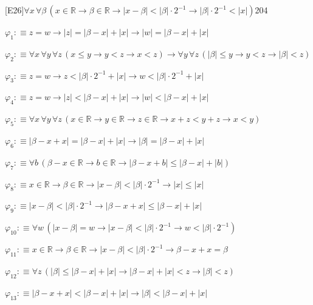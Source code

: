 \begin{fullproof}{[E26]}{$\forall x\,\forall \beta\,(x \in \mathbb{R} \to \beta \in \mathbb{R} \to \lvert x - \beta \rvert < \lvert \beta \rvert \cdot 2^{-1} \to \lvert \beta \rvert \cdot 2^{-1} < \lvert x \rvert)$}{204}
\begin{abbrevlist}
\item $\varphi_{1} :\equiv z = w \to \lvert z \rvert = \lvert \beta - x \rvert + \lvert x \rvert \to \lvert w \rvert = \lvert \beta - x \rvert + \lvert x \rvert$
\item $\varphi_{2} :\equiv \forall x\,\forall y\,\forall z\,(x \leq y \to y < z \to x < z) \to \forall y\,\forall z\,(\lvert \beta \rvert \leq y \to y < z \to \lvert \beta \rvert < z)$
\item $\varphi_{3} :\equiv z = w \to z < \lvert \beta \rvert \cdot 2^{-1} + \lvert x \rvert \to w < \lvert \beta \rvert \cdot 2^{-1} + \lvert x \rvert$
\item $\varphi_{4} :\equiv z = w \to \lvert z \rvert < \lvert \beta - x \rvert + \lvert x \rvert \to \lvert w \rvert < \lvert \beta - x \rvert + \lvert x \rvert$
\item $\varphi_{5} :\equiv \forall x\,\forall y\,\forall z\,(x \in \mathbb{R} \to y \in \mathbb{R} \to z \in \mathbb{R} \to x + z < y + z \to x < y)$
\item $\varphi_{6} :\equiv \lvert \beta - x + x \rvert = \lvert \beta - x \rvert + \lvert x \rvert \to \lvert \beta \rvert = \lvert \beta - x \rvert + \lvert x \rvert$
\item $\varphi_{7} :\equiv \forall b\,(\beta - x \in \mathbb{R} \to b \in \mathbb{R} \to \lvert \beta - x + b \rvert \leq \lvert \beta - x \rvert + \lvert b \rvert)$
\item $\varphi_{8} :\equiv x \in \mathbb{R} \to \beta \in \mathbb{R} \to \lvert x - \beta \rvert < \lvert \beta \rvert \cdot 2^{-1} \to \lvert x \rvert \leq \lvert x \rvert$
\item $\varphi_{9} :\equiv \lvert x - \beta \rvert < \lvert \beta \rvert \cdot 2^{-1} \to \lvert \beta - x + x \rvert \leq \lvert \beta - x \rvert + \lvert x \rvert$
\item $\varphi_{10} :\equiv \forall w\,(\lvert x - \beta \rvert = w \to \lvert x - \beta \rvert < \lvert \beta \rvert \cdot 2^{-1} \to w < \lvert \beta \rvert \cdot 2^{-1})$
\item $\varphi_{11} :\equiv x \in \mathbb{R} \to \beta \in \mathbb{R} \to \lvert x - \beta \rvert < \lvert \beta \rvert \cdot 2^{-1} \to \beta - x + x = \beta$
\item $\varphi_{12} :\equiv \forall z\,(\lvert \beta \rvert \leq \lvert \beta - x \rvert + \lvert x \rvert \to \lvert \beta - x \rvert + \lvert x \rvert < z \to \lvert \beta \rvert < z)$
\item $\varphi_{13} :\equiv \lvert \beta - x + x \rvert < \lvert \beta - x \rvert + \lvert x \rvert \to \lvert \beta \rvert < \lvert \beta - x \rvert + \lvert x \rvert$

\end{abbrevlist}
\end{fullproof}
